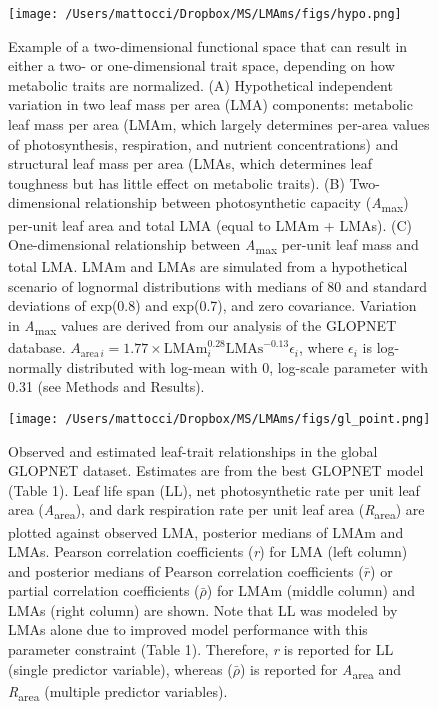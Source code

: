 \documentclass[
  12pt,
  letterpaper,
  DIV=11,
  numbers=noendperiod]{scrartcl}
\begin{document}
\newpage

\begin{figure}

{\centering \texttt{[image: /Users/mattocci/Dropbox/MS/LMAms/figs/hypo.png]}

}

\caption{\label{fig-hypo}Example of a two-dimensional functional space
that can result in either a two- or one-dimensional trait space,
depending on how metabolic traits are normalized. (A) Hypothetical
independent variation in two leaf mass per area (LMA) components:
metabolic leaf mass per area (LMAm, which largely determines per-area
values of photosynthesis, respiration, and nutrient concentrations) and
structural leaf mass per area (LMAs, which determines leaf toughness but
has little effect on metabolic traits). (B) Two-dimensional relationship
between photosynthetic capacity (\emph{A}\textsubscript{max}) per-unit
leaf area and total LMA (equal to LMAm + LMAs). (C) One-dimensional
relationship between \emph{A}\textsubscript{max} per-unit leaf mass and
total LMA. LMAm and LMAs are simulated from a hypothetical scenario of
lognormal distributions with medians of 80 and standard deviations of
exp(0.8) and exp(0.7), and zero covariance. Variation in
\emph{A}\textsubscript{max} values are derived from our analysis of the
GLOPNET database.
\(A_{\mathrm{area} \, i}=1.77 \times \mathrm{LMAm}_i^{0.28}\mathrm{LMAs}^{-0.13}\epsilon_i\),
where \(\epsilon_i\) is log-normally distributed with log-mean with 0,
log-scale parameter with 0.31 (see Methods and Results).}

\end{figure}

\begin{figure}

{\centering \texttt{[image: /Users/mattocci/Dropbox/MS/LMAms/figs/gl\_point.png]}

}

\caption{\label{fig-gl_point}Observed and estimated leaf-trait
relationships in the global GLOPNET dataset. Estimates are from the best
GLOPNET model (Table 1). Leaf life span (LL), net photosynthetic rate
per unit leaf area (\emph{A}\textsubscript{area}), and dark respiration
rate per unit leaf area (\emph{R}\textsubscript{area}) are plotted
against observed LMA, posterior medians of LMAm and LMAs. Pearson
correlation coefficients (\emph{r}) for LMA (left column) and posterior
medians of Pearson correlation coefficients (\(\bar{r}\)) or partial
correlation coefficients (\(\bar{\rho}\)) for LMAm (middle column) and
LMAs (right column) are shown. Note that LL was modeled by LMAs alone
due to improved model performance with this parameter constraint (Table
1). Therefore, \emph{r} is reported for LL (single predictor variable),
whereas (\(\bar{\rho}\)) is reported for \emph{A}\textsubscript{area}
and \emph{R}\textsubscript{area} (multiple predictor variables).}

\end{figure}
\end{document}
